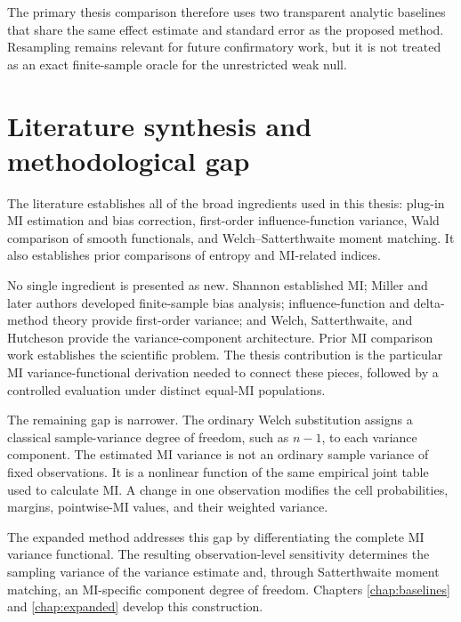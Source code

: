 The primary thesis comparison therefore uses two transparent analytic
baselines that share the same effect estimate and standard error as the
proposed method. Resampling remains relevant for future confirmatory work, but
it is not treated as an exact finite-sample oracle for the unrestricted weak
null.

\section{Literature synthesis and methodological gap}

The literature establishes all of the broad ingredients used in this thesis:
plug-in MI estimation and bias correction, first-order influence-function
variance, Wald comparison of smooth functionals, and
Welch--Satterthwaite moment matching. It also establishes prior comparisons of
entropy and MI-related indices.

No single ingredient is presented as new. Shannon established MI; Miller and
later authors developed finite-sample bias analysis; influence-function and
delta-method theory provide first-order variance; and Welch, Satterthwaite,
and Hutcheson provide the variance-component architecture. Prior MI comparison
work establishes the scientific problem. The thesis contribution is the
particular MI variance-functional derivation needed to connect these pieces,
followed by a controlled evaluation under distinct equal-MI populations.

The remaining gap is narrower. The ordinary Welch substitution assigns a
classical sample-variance degree of freedom, such as \(n-1\), to each variance
component. The estimated MI variance is not an ordinary sample variance of
fixed observations. It is a nonlinear function of the same empirical joint
table used to calculate MI. A change in one observation modifies the cell
probabilities, margins, pointwise-MI values, and their weighted variance.

The expanded method addresses this gap by differentiating the complete MI
variance functional. The resulting observation-level sensitivity determines
the sampling variance of the variance estimate and, through Satterthwaite
moment matching, an MI-specific component degree of freedom. Chapters
\ref{chap:baselines} and \ref{chap:expanded} develop this construction.
